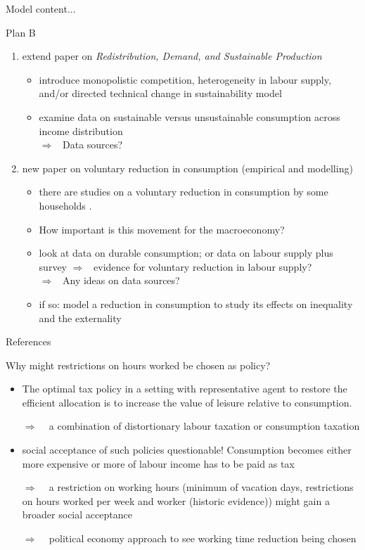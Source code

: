 \documentclass[11pt,aspectratio=169]{beamer}
\newcommand{\ar}{$\Rightarrow$ \ }
\begin{document}
\begin{frame}{Model}
	content...
\end{frame}

\begin{frame}{Plan B}
\begin{enumerate}
	\item extend paper on \textit{Redistribution, Demand, and Sustainable Production}
	\begin{itemize}
\item introduce monopolistic competition, heterogeneity in labour supply, and/or directed technical change in sustainability model
\item examine data on sustainable versus unsustainable consumption across income distribution  \\
\alert{\ar Data sources?}
	\end{itemize}
\item new paper on voluntary reduction in consumption (empirical and modelling)
\begin{itemize}
	\item there are studies on a voluntary reduction in consumption by some households \citep{Alexander2012TheContext}. 
	\item How important is this movement for the macroeconomy?
\item look at data on durable consumption; or data on labour supply plus survey \ar evidence for voluntary reduction in labour supply?\\
\alert{\ar Any ideas on data sources?}
\item if so: model a reduction in consumption to study its effects on inequality and the externality
\end{itemize}
\end{enumerate}
\end{frame}
\begin{frame}[allowframebreaks]{References}
	
	
	
\end{frame}

\appendix
\begin{frame}{Why might restrictions on hours worked be chosen as policy?}
	\begin{itemize}
		\item \cite{Alvarez-Cuadrado2007EnvyHours}
		The optimal tax policy in a setting with representative agent to restore the efficient allocation is to increase the value of leisure relative to consumption.
		\item[\ar] a combination of distortionary labour taxation or consumption taxation
		\item social acceptance of such policies questionable! Consumption becomes either more expensive or more of labour income has to be paid as tax
		\item[\ar] a restriction on working hours (minimum of vacation days, restrictions on hours worked per week and worker (historic evidence)) might gain a broader social acceptance
		\item[\ar] political economy approach to see working time reduction being chosen
	\end{itemize}
\end{frame}
\end{document}
